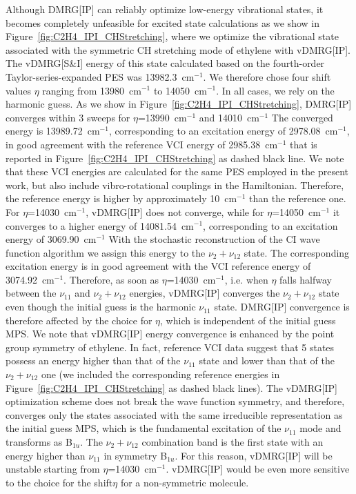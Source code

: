 \documentclass[journal=jctcce]{achemso}
\begin{document}
\noindent Although DMRG[IP] can reliably optimize low-energy vibrational states, it becomes completely unfeasible
for excited state calculations as we show in Figure~\ref{fig:C2H4_IPI_CHStretching}, where we optimize the vibrational state associated with the symmetric CH stretching mode of ethylene with vDMRG[IP].
The vDMRG[S\&I] energy of this state calculated based on the fourth-order Taylor-series-expanded PES 
was 13982.3~cm$^{-1}$.\cite{Baiardi2019_HighEnergy-vDMRG}
We therefore chose four shift values $\eta$ ranging from 13980~cm$^{-1}$ to 14050~cm$^{-1}$.
In all cases, we rely on the harmonic guess.
As we show in Figure~\ref{fig:C2H4_IPI_CHStretching}, DMRG[IP] converges within 3 sweeps for $\eta$=13990~cm$^{-1}$ and 14010~cm$^{-1}$
The converged energy is 13989.72~cm$^{-1}$, corresponding to an excitation energy of 2978.08~cm$^{-1}$, in good agreement with the reference VCI energy\cite{Delahaye2014_EthylenePES} of 2985.38~cm$^{-1}$ that is reported in Figure~\ref{fig:C2H4_IPI_CHStretching} as dashed black line.
We note that these VCI energies are calculated for the same PES employed in the present work, but also include vibro-rotational couplings in the Hamiltonian.
Therefore, the reference energy is higher by approximately 10~cm$^{-1}$ than the reference one.
For $\eta$=14030~cm$^{-1}$, vDMRG[IP] does not converge, while for $\eta$=14050~cm$^{-1}$ it converges to a higher energy of 14081.54~cm$^{-1}$, corresponding to an excitation energy of 3069.90~cm$^{-1}$
With the stochastic reconstruction of the CI wave function algorithm\cite{Boguslawski2011_SRCAS,Baiardi2017_VDMRG} we assign this energy to the $\nu_{2}+\nu_{12}$ state.
The corresponding excitation energy is in good agreement with the VCI reference energy\cite{Delahaye2014_EthylenePES} of 3074.92~cm$^{-1}$.
Therefore, as soon as $\eta$=14030~cm$^{-1}$, i.e. when $\eta$ falls halfway between the $\nu_{11}$ and $\nu_{2}+\nu_{12}$ energies, vDMRG[IP] converges the $\nu_{2}+\nu_{12}$ state even though the initial guess is the harmonic $\nu_{11}$ state.
DMRG[IP] convergence is therefore affected by the choice for $\eta$, which is independent of the initial guess MPS.
We note that vDMRG[IP] energy convergence is enhanced by the point group symmetry of ethylene.
In fact, reference VCI data\cite{Delahaye2014_EthylenePES} suggest that 5 states possess an energy higher than that of 
the $\nu_{11}$ state and lower than that of 
the $\nu_{2}+\nu_{12}$ one (we included the corresponding reference energies in Figure~\ref{fig:C2H4_IPI_CHStretching} as dashed black lines).
The vDMRG[IP] optimization scheme does not break the wave function symmetry, and therefore, converges only the states associated with the same irreducible representation as the initial guess MPS, which is the fundamental excitation of the $\nu_{11}$ mode and transforms as B$_{1u}$.
The $\nu_{2}+\nu_{12}$ combination band is the first state with an energy higher than $\nu_{11}$ in symmetry B$_{1u}$.
For this reason, vDMRG[IP] will be unstable starting from $\eta$=14030~cm$^{-1}$.
vDMRG[IP] would be even more sensitive to the choice for the shift$\eta$ for a non-symmetric molecule.
\end{document}
